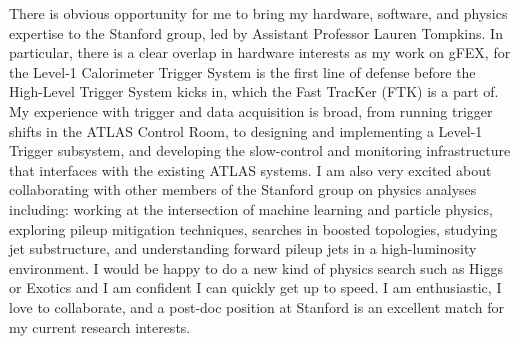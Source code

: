 

There is obvious opportunity for me to bring my hardware, software, and physics expertise to the Stanford group, led by Assistant Professor Lauren Tompkins. In particular, there is a clear overlap in hardware interests as my work on gFEX, for the Level-1 Calorimeter Trigger System is the first line of defense before the High-Level Trigger System kicks in, which the Fast TracKer (FTK) is a part of. My experience with trigger and data acquisition is broad, from running trigger shifts in the ATLAS Control Room, to designing and implementing a Level-1 Trigger subsystem, and developing the slow-control and monitoring infrastructure that interfaces with the existing ATLAS systems. I am also very excited about collaborating with other members of the Stanford group on physics analyses including: working at the intersection of machine learning and particle physics, exploring pileup mitigation techniques, searches in boosted topologies, studying jet substructure, and understanding forward pileup jets in a high-luminosity environment. I would be happy to do a new kind of physics search such as Higgs or Exotics and I am confident I can quickly get up to speed. I am enthusiastic, I love to collaborate, and a post-doc position at Stanford is an excellent match for my current research interests.


